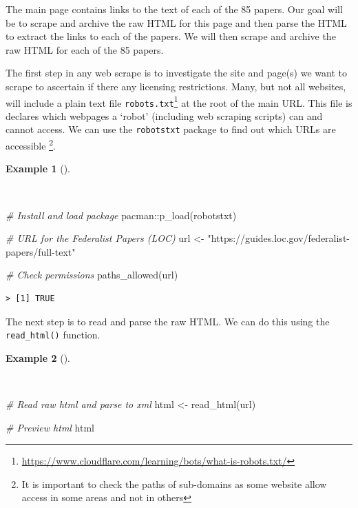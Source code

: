 \documentclass[
  letterpaper,
  DIV=11,
  numbers=noendperiod]{scrreport}
\newenvironment{Shaded}{\begin{snugshade}}{\end{snugshade}}
\newcommand{\CommentTok}[1]{\textcolor[rgb]{0.00,0.00,0.00}{\textit{#1}}}
\newcommand{\FunctionTok}[1]{\textcolor[rgb]{0.00,0.00,0.00}{#1}}
\newcommand{\NormalTok}[1]{\textcolor[rgb]{0.00,0.00,0.00}{#1}}
\newcommand{\OtherTok}[1]{\textcolor[rgb]{0.00,0.00,0.00}{#1}}
\newcommand{\SpecialCharTok}[1]{\textcolor[rgb]{0.00,0.00,0.00}{#1}}
\newcommand{\StringTok}[1]{\textcolor[rgb]{0.00,0.00,0.00}{#1}}
\theoremstyle{definition}
\newtheorem{example}{Example}[chapter]
\theoremstyle{remark}
\DeclareRobustCommand{\href}[2]{#2\footnote{\url{#1}}}
\begin{document}
The main page contains links to the text of each of the 85 papers. Our
goal will be to scrape and archive the raw HTML for this page and then
parse the HTML to extract the links to each of the papers. We will then
scrape and archive the raw HTML for each of the 85 papers.

The first step in any web scrape is to investigate the site and page(s)
we want to scrape to ascertain if there any licensing restrictions.
Many, but not all websites, will include a plain text file
\href{https://www.cloudflare.com/learning/bots/what-is-robots.txt/}{\texttt{robots.txt}}
at the root of the main URL. This file is declares which webpages a
`robot' (including web scraping scripts) can and cannot access. We can
use the \texttt{robotstxt} package to find out which URLs are accessible
\footnote{It is important to check the paths of sub-domains as some
  website allow access in some areas and not in others}.

\begin{example}[]\protect\hypertarget{exm-ad-fed-permissions}{}\label{exm-ad-fed-permissions}

~

\begin{Shaded}
\begin{Highlighting}[]
\CommentTok{\# Install and load package}
\NormalTok{pacman}\SpecialCharTok{::}\FunctionTok{p\_load}\NormalTok{(robotstxt)}

\CommentTok{\# URL for the Federalist Papers (LOC)}
\NormalTok{url }\OtherTok{\textless{}{-}} \StringTok{"https://guides.loc.gov/federalist{-}papers/full{-}text"}

\CommentTok{\# Check permissions}
\FunctionTok{paths\_allowed}\NormalTok{(url)}
\end{Highlighting}
\end{Shaded}

\begin{verbatim}
> [1] TRUE
\end{verbatim}

\end{example}

The next step is to read and parse the raw HTML. We can do this using
the \texttt{read\_html()} function.

\begin{example}[]\protect\hypertarget{exm-ad-fed-read-html}{}\label{exm-ad-fed-read-html}

~

\begin{Shaded}
\begin{Highlighting}[]
\CommentTok{\# Read raw html and parse to xml}
\NormalTok{html }\OtherTok{\textless{}{-}} \FunctionTok{read\_html}\NormalTok{(url)}

\CommentTok{\# Preview html}
\NormalTok{html}
\end{Highlighting}
\end{Shaded}

\end{example}
\end{document}
